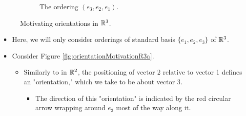 \documentclass[../notes.tex]{subfiles}
\begin{document}
\begin{itemize}
\begin{figure}[h!]
\begin{subfigure}[b]{0.3\linewidth}
            \caption{The ordering $(e_3,e_2,e_1)$.}
            \label{fig:orientationMotivationR3f}
        \end{subfigure}
        \caption{Motivating orientations in $\mathbb{R}^3$.}
        \label{fig:orientationMotivationR3}
    \end{figure}
    \begin{itemize}
        \item Here, we will only consider orderings of standard basis $\{e_1,e_2,e_3\}$ of $\mathbb{R}^3$.
        \item Consider Figure \ref{fig:orientationMotivationR3a}.
        \begin{itemize}
            \item Similarly to in $\mathbb{R}^2$, the positioning of vector 2 relative to vector 1 defines an "orientation," which we take to be about vector 3.
            \begin{itemize}
                \item The direction of this "orientation" is indicated by the red circular arrow wrapping around $e_3$ most of the way along it.
            \end{itemize}

\end{itemize}
\end{itemize}
\end{itemize}
\end{document}
